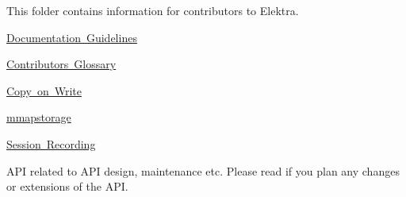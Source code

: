 \label{doc_contrib_README_md_md_doc_contrib_README}%
%
This folder contains information for contributors to Elektra.


\begin{DoxyItemize}
\item \mbox{\hyperlink{doc_contrib_documentation_md}{Documentation Guidelines}}
\item \mbox{\hyperlink{doc_contrib_contrib-glossary_md}{Contributor\textquotesingle{}s Glossary}}
\item \mbox{\hyperlink{doc_contrib_copy_on_write_md}{Copy on Write}}
\item \mbox{\hyperlink{doc_contrib_mmapstorage_md}{mmapstorage}}
\item \mbox{\hyperlink{doc_contrib_recording_md}{Session Recording}}
\item API related to API design, maintenance etc. Please read if you plan any changes or extensions of the API. 
\end{DoxyItemize}